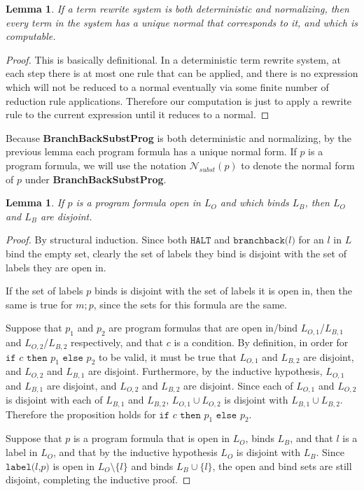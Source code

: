 \documentclass[11pt]{article}
\begin{document}
\newtheorem*{uniquenormal}{Lemma}
\begin{uniquenormal}
If a term rewrite system is both deterministic and normalizing, then every term in the system has a unique normal that corresponds to it, and which is computable.
\end{uniquenormal}

\begin{proof}
This is basically definitional.  In a deterministic term rewrite system, at each step there is at most one rule that can be applied, and there is no expression which will not be reduced to a normal eventually via some finite number of reduction rule applications.  Therefore our computation is just to apply a rewrite rule to the current expression until it reduces to a normal.
\end{proof}

Because \textbf{BranchBackSubstProg} is both deterministic and normalizing, by the previous lemma each program formula has a unique normal form.  If $p$ is a program formula, we will use the notation $\mathcal{N}_{subst}(p)$ to denote the normal form of $p$ under \textbf{BranchBackSubstProg}.

\newtheorem*{openbinddisjoint}{Lemma}
\begin{openbinddisjoint}
If $p$ is a program formula open in $L_{O}$ and which binds $L_{B}$, then $L_{O}$ and $L_{B}$ are disjoint.
\end{openbinddisjoint}
\begin{proof}
By structural induction.  Since both $\texttt{HALT}$ and $\texttt{branchback(}l\texttt{)}$ for an $l$ in $L$ bind the empty set, clearly the set of labels they bind is disjoint with the set of labels they are open in.

If the set of labels $p$ binds is disjoint with the set of labels it is open in, then the same is true for $m; p$, since the sets for this formula are the same.

Suppose that $p_{1}$ and $p_{2}$ are program formulas that are open in/bind $L_{O,1}$/$L_{B,1}$ and $L_{O,2}$/$L_{B,2}$ respectively, and that $c$ is a condition.  By definition, in order for $\texttt{if } c \texttt{ then } p_{1} \texttt{ else } p_{2}$ to be valid, it must be true that $L_{O,1}$ and $L_{B,2}$ are disjoint, and $L_{O,2}$ and $L_{B,1}$ are disjoint.  Furthermore, by the inductive hypothesis, $L_{O,1}$ and $L_{B,1}$ are disjoint, and $L_{O,2}$ and $L_{B,2}$ are disjoint.  Since each of $L_{O,1}$ and $L_{O,2}$ is disjoint with each of $L_{B,1}$ and $L_{B,2}$, $L_{O,1} \cup L_{O,2}$ is disjoint with $L_{B,1} \cup L_{B,2}$.  Therefore the proposition holds for $\texttt{if } c \texttt{ then } p_{1} \texttt{ else } p_{2}$.

Suppose that $p$ is a program formula that is open in $L_{O}$, binds $L_{B}$, and that $l$ is a label in $L_{O}$, and that by the inductive hypothesis $L_{O}$ is disjoint with $L_{B}$.  Since $\texttt{label(}l\texttt{,} p \texttt{)}$ is open in $L_{O} \setminus \{l\}$ and binds $L_{B} \cup \{l\}$, the open and bind sets are still disjoint, completing the inductive proof.
\end{proof}
\end{document}
